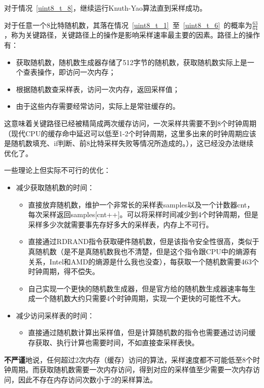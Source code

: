 \documentclass{article}
\begin{document}
    对于情况~\ref{uint8_t_8}，继续运行Knuth-Yao算法直到采样成功。
    
    对于任意一个8比特随机数，其落在情况~\ref{uint8_t_1}~至~\ref{uint8_t_6}~的概率为$\frac{63}{64}$，称为关键路径，关键路径上的操作是影响采样速率最主要的因素。路径上的操作有：
    \begin{itemize}
        \item 获取随机数，随机数生成器存储了512字节的随机数，获取随机数实际上是一个查表操作，即访问一次内存；
        \item 根据随机数查采样表，访问一次内存，返回采样值；
        \item 由于这些内存需要经常访问，实际上是常驻缓存的。
    \end{itemize}
    这意味着关键路径已经被精简成两次缓存访问，一次采样共需要不到8个时钟周期（现代CPU的缓存命中延迟可以低至1-2个时钟周期，这里多出来的时钟周期应该是随机数填充、if判断、前8比特采样失败等情况所造成的。），这已经没办法继续优化了。
    
    一些理论上但实际不可行的优化：
    \begin{itemize}
        \item 减少获取随机数的时间：
        \begin{itemize}
            \item 直接放弃随机数，维护一个非常长的采样表samples以及一个计数器cnt，每次采样返回samples[cnt++]。可以将采样时间减少到4个时钟周期，但是采样多少次就需要事先存好多大的采样表，内存上不可行。
            \item 直接通过RDRAND指令获取硬件随机数，但是该指令安全性很高，类似于真随机数（是不是真随机数我也不清楚，但是这个指令跟CPU中的熵源有关系，Intel和AMD的熵源是什么我也没查），每获取一个随机数需要463个时钟周期，得不偿失。
            \item 自己实现一个更快的随机数生成器，但是官方给的随机数生成器速率每生成一个随机数大约只需要4个时钟周期，实现一个更快的可能性不大。
        \end{itemize}
        \item 减少访问采样表的时间：
        \begin{itemize}
            \item 直接通过随机数计算出采样值，但是计算随机数的指令也需要通过访问缓存获取、执行计算也需要时间，不如直接查采样表快。
        \end{itemize}
    \end{itemize}
    \textbf{不严谨}地说，任何超过2次内存（缓存）访问的算法，采样速度都不可能低至8个时钟周期。而获取随机数需要一次内存访问，得到对应的采样值至少需要一次内存访问，因此不存在内存访问次数小于2的采样算法。
    
\end{document}
